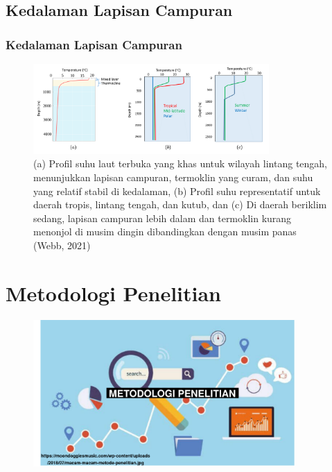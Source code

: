 \documentclass{beamer}
\begin{document}
\subsection{Kedalaman Lapisan Campuran}
\begin{frame}[allowframebreaks]
	\frametitle{Kedalaman Lapisan Campuran}
		\begin{figure}[H]
		\centering
		\includegraphics[width=9cm]{mld_theory.png}
		\caption{(a) Profil suhu laut terbuka yang khas untuk wilayah lintang tengah, menunjukkan lapisan campuran, termoklin yang curam, dan suhu yang relatif stabil di kedalaman, (b) Profil suhu representatif untuk daerah tropis, lintang tengah, dan kutub, dan (c) Di daerah beriklim sedang, lapisan campuran lebih dalam dan termoklin kurang menonjol di musim dingin dibandingkan dengan musim panas (Webb, 2021)}
		\label{fig:mld_theory}
	\end{figure}	
\end{frame}

\section{Metodologi Penelitian}
\begin{frame}
	\centering
	\begin{figure}[H]
		\centering
		\includegraphics[width=10cm]{Bg_3}
	\end{figure}
\end{frame}
\end{document}
